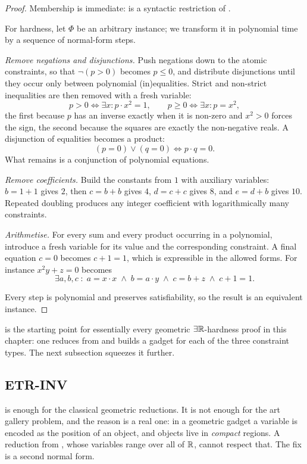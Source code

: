 \begin{proof}
Membership is immediate:  is a syntactic restriction of \ETR{}.

For hardness, let $\Phi$ be an arbitrary \ETR{} instance; we transform it in
polynomial time by a sequence of normal-form steps.

\emph{Remove negations and disjunctions.} Push negations down to the atomic
constraints, so that $\neg(p > 0)$ becomes $p \le 0$, and distribute
disjunctions until they occur only between polynomial (in)equalities. Strict and
non-strict inequalities are then removed with a fresh variable:
\[ p > 0 \iff \exists x : p \cdot x^2 = 1, \qquad
   p \ge 0 \iff \exists x : p = x^2, \]
the first because $p$ has an inverse exactly when it is non-zero and $x^2 > 0$
forces the sign, the second because the squares are exactly the non-negative
reals. A disjunction of equalities becomes a product:
\[ (p = 0) \vee (q = 0) \iff p \cdot q = 0. \]
What remains is a conjunction of polynomial equations.

\emph{Remove coefficients.} Build the constants from $1$ with auxiliary
variables: $b = 1+1$ gives $2$, then $c = b+b$ gives $4$, $d = c+c$ gives $8$,
and $e = d+b$ gives $10$. Repeated doubling produces any integer coefficient
with logarithmically many constraints.

\emph{Arithmetise.} For every sum and every product occurring in a polynomial,
introduce a fresh variable for its value and the corresponding constraint. A
final equation $c = 0$ becomes $c + 1 = 1$, which is expressible in the allowed
forms. For instance $x^2y + z = 0$ becomes
\[ \exists a,b,c \;:\; a = x \cdot x \;\wedge\; b = a \cdot y \;\wedge\;
   c = b + z \;\wedge\; c + 1 = 1. \]

Every step is polynomial and preserves satisfiability, so the result is an
equivalent  instance.
\end{proof}

 is the starting point for essentially every geometric
$\exists\mathbb{R}$-hardness proof in this chapter: one reduces from  and builds
a gadget for each of the three constraint types. The next subsection squeezes
it further.

\subsection{ETR-INV}
\label{sec:etr-inv}

 is enough for the classical geometric reductions. It is not
enough for the art gallery problem, and the reason is a real one: in a geometric
gadget a variable is encoded as the position of an object, and objects live in
\emph{compact} regions. A reduction from , whose variables range
over all of $\mathbb{R}$, cannot respect that. The fix is a second normal form.

